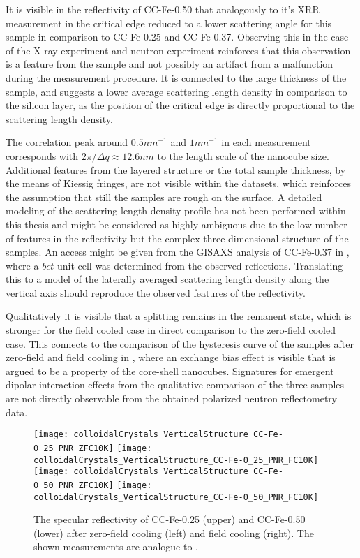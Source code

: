 \documentclass[\main/dresen_thesis.tex]{subfiles}
\begin{document}
  It is visible in the reflectivity of CC-Fe-0.50 that analogously to it's XRR measurement in  the critical edge reduced to a lower scattering angle for this sample in comparison to CC-Fe-0.25 and CC-Fe-0.37.
  Observing this in the case of the X-ray experiment and neutron experiment reinforces that this observation is a feature from the sample and not possibly an artifact from a malfunction during the measurement procedure.
  It is connected to the large thickness of the sample, and suggests a lower average scattering length density in comparison to the silicon layer, as the position of the critical edge is directly proportional to the scattering length density.

  The correlation peak around $0.5 \unit{nm^{-1}}$ and $1 \unit{nm^{-1}}$ in each measurement corresponds with $2 \pi / \Delta q \approx 12.6 \unit{nm}$ to the length scale of the nanocube size.
  Additional features from the layered structure or the total sample thickness, by the means of Kiessig fringes, are not visible within the datasets, which reinforces the assumption that still the samples are rough on the surface.
  A detailed modeling of the scattering length density profile has not been performed within this thesis and might be considered as highly ambiguous due to the low number of features in the reflectivity but the complex three-dimensional structure of the samples.
  An access might be given from the GISAXS analysis of CC-Fe-0.37 in , where a $bct$ unit cell was determined from the observed reflections.
  Translating this to a model of the laterally averaged scattering length density along the vertical axis should reproduce the observed features of the reflectivity.

  Qualitatively it is visible that a splitting remains in the remanent state, which is stronger for the field cooled case in direct comparison to the zero-field cooled case.
  This connects to the comparison of the hysteresis curve of the samples after zero-field and field cooling in , where an exchange bias effect is visible that is argued to be a property of the core-shell nanocubes.
  Signatures for emergent dipolar interaction effects from the qualitative comparison of the three samples are not directly observable from the obtained polarized neutron reflectometry data.


  \begin{figure}[tb]
    \centering
    \texttt{[image: colloidalCrystals\_VerticalStructure\_CC-Fe-0\_25\_PNR\_ZFC10K]}
    \texttt{[image: colloidalCrystals\_VerticalStructure\_CC-Fe-0\_25\_PNR\_FC10K]}
    \texttt{[image: colloidalCrystals\_VerticalStructure\_CC-Fe-0\_50\_PNR\_ZFC10K]}
    \texttt{[image: colloidalCrystals\_VerticalStructure\_CC-Fe-0\_50\_PNR\_FC10K]}
    \caption{\label{fig:colloidalCrystals:pnrCCFe2550} The specular reflectivity of CC-Fe-0.25 (upper) and CC-Fe-0.50 (lower) after zero-field cooling (left) and field cooling (right). The shown measurements are analogue to .}
  \end{figure}
\end{document}
